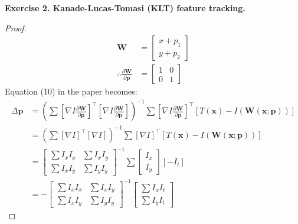 \documentclass[letterpaper, 11pt]{article}
\begin{document}
\bigskip
\textbf{Exercise 2. Kanade-Lucas-Tomasi (KLT) feature tracking.}
\begin{proof}
    \begin{align*}
        \textbf{W}                                    & =
        \begin{bmatrix}
            x + p_1 \\
            y + p_2
        \end{bmatrix}                                    \\
        \therefore
        \frac{\partial\textbf{W}}{\partial\textbf{p}} & =
        \begin{bmatrix}
            1 & 0 \\
            0 & 1
        \end{bmatrix}
    \end{align*}
    Equation (10) in the paper becomes:
    \begin{align*}
        \Delta\textbf{p} & = (\sum{[\nabla I \frac{\partial \textbf{W}}{\partial \textbf{p}}]^\top}[\nabla I \frac{\partial \textbf{W}}{\partial \textbf{p}}])^{-1} \sum{[\nabla I \frac{\partial \textbf{W}}{\partial \textbf{p}}]^\top[T(\textbf{x})-I(\textbf{W}(\textbf{x};\textbf{p}))]} \\
                         & = (\sum{[\nabla I]^\top}[\nabla I])^{-1} \sum{[\nabla I]^\top[T(\textbf{x})-I(\textbf{W}(\textbf{x};\textbf{p}))]}                                                                                                                                                 \\
                         & =
        \begin{bmatrix}
            \sum{I_x I_x} & \sum{I_x I_y} \\
            \sum{I_x I_y} & \sum{I_y I_y}
        \end{bmatrix}^{-1}
        \sum{
        \begin{bmatrix}
            I_x \\
            I_y
        \end{bmatrix}
        [-I_t]
        }                                                                                                                                                                                                                                                                                     \\
                         & =-
        \begin{bmatrix}
            \sum{I_x I_x} & \sum{I_x I_y} \\
            \sum{I_x I_y} & \sum{I_y I_y}
        \end{bmatrix}^{-1}
        \begin{bmatrix}
            \sum{I_x I_t} \\
            \sum{I_y I_t}
        \end{bmatrix}
    \end{align*}
\end{proof}
\end{document}
